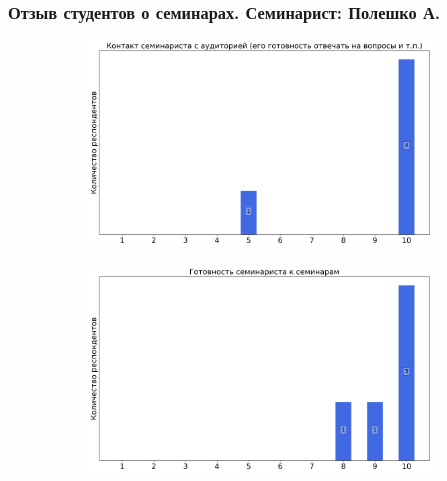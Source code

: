     \subsubsection{Отзыв студентов о семинарах. Семинарист: Полешко А.}
        \begin{figure}[H]
            \centering
            \begin{subfigure}[b]{0.45\textwidth}
                \centering
                \includegraphics[width=\textwidth]{images/4 course/Защита информации/seminarists-marks-Полешко А.-0.png}
            \end{subfigure}
            \begin{subfigure}[b]{0.45\textwidth}
                \centering
                \includegraphics[width=\textwidth]{images/4 course/Защита информации/seminarists-marks-Полешко А.-1.png}
            \end{subfigure}
            \begin{subfigure}[b]{0.45\textwidth}
                \centering

\end{subfigure}
\end{figure}
